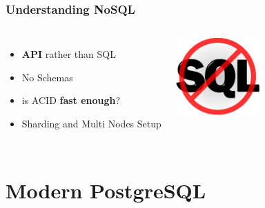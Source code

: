 \documentclass{beamer}
\begin{document}
\begin{frame}[fragile]
  \frametitle{Understanding NoSQL}

  \vfill

\begin{columns}[c]

  \begin{itemize}
  \item \textbf{API} rather than SQL
  \item No Schemas
  \item is ACID \textbf{fast enough}?
  \item Sharding and Multi Nodes Setup
  \end{itemize}

\begin{center}
  \includegraphics[height=8em]{nosql.png}
\end{center}
\end{columns}
\end{frame}

\section{Modern PostgreSQL}

\end{document}
